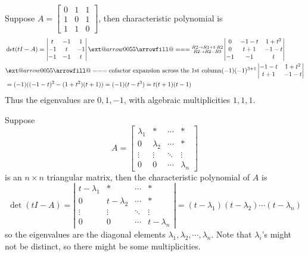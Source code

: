 \documentclass{beamer}
\makeatletter
\newcommand*{\Relbarfill@}{\arrowfill@\Relbar\Relbar\Relbar}
\newcommand*{\xequal}[2][]{\ext@arrow 0055\Relbarfill@{#1}{#2}}
\theoremstyle{definition}
\theoremstyle{remark}
\makeatother
\begin{document}
\begin{frame}[t]
\begin{example}
Suppose $A=\begin{bmatrix}
0&1&1\\
1&0&1\\
1&1&0
\end{bmatrix}$, then characteristic polynomial is\pause
\begin{align*}
&\det(tI-A)=\left|\begin{matrix}
t&-1&1\\
-1&t&-1\\
-1&-1&t
\end{matrix}\right|\xequal{\substack{R2\rightarrow R1+t\cdot R2\\R2\rightarrow R2-R3}}\left|\begin{matrix}
0&-1-t&1+t^2\\
0&t+1&-1-t\\
-1&-1&t
\end{matrix}\right|\\
&\xequal{\text{cofactor expansion across the 1st column}}(-1)(-1)^{3+1}\left|\begin{matrix}
-1-t&1+t^2\\
t+1&-1-t\\
\end{matrix}\right|\\
&=(-1)((-1-t)^2-(1+t^2)(t+1))=(-1)(t-t^3)=t(t+1)(t-1)
\end{align*}\pause
Thus the eigenvalues are $0,1,-1$, with algebraic multiplicities $1,1,1$.
\end{example}
\end{frame}

\begin{frame}[t]
\begin{example}
Suppose
\[
A=\begin{bmatrix}
\lambda_1&*&\cdots&*\\
0&\lambda_2&\cdots&*\\
\vdots&\vdots&\ddots&\vdots\\
0&0&\cdots&\lambda_n
\end{bmatrix}
\]
is an $n\times n$ triangular matrix, then the characteristic polynomial of $A$ is\pause
\[
\det(tI-A)=\left|\begin{matrix}
t-\lambda_1&*&\cdots&*\\
0&t-\lambda_2&\cdots&*\\
\vdots&\vdots&\ddots&\vdots\\
0&0&\cdots&t-\lambda_n
\end{matrix}\right|=(t-\lambda_1)(t-\lambda_2)\cdots(t-\lambda_n)
\]\pause
so the eigenvalues are the diagonal elements $\lambda_1,\lambda_2,\cdots,\lambda_n$. Note that $\lambda_i$'s might not be distinct, so there might be some multiplicities.
\end{example}
\end{frame}
\end{document}
